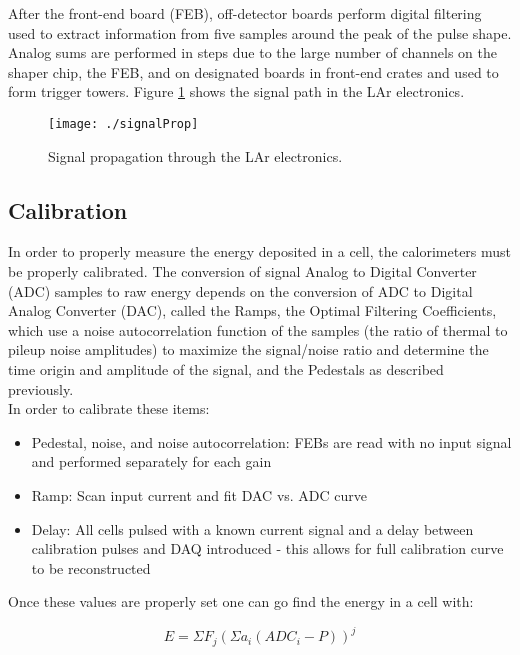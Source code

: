 After the front-end board (FEB), off-detector boards perform digital filtering used to extract information from five samples around the peak of the pulse shape.  Analog sums are performed in steps due to the large number of channels on the shaper chip, the FEB, and on designated boards in front-end crates and used to form trigger towers.  Figure \ref{fig:sigProp} shows the signal path in the LAr electronics.  \\

\begin{figure}[h!]
  \centering
	\texttt{[image: ./signalProp]}
\caption{\label{fig:sigProp}{ Signal propagation through the LAr electronics\cite{larPerf}. }} %
\end{figure}

\subsection{Calibration}

In order to properly measure the energy deposited in a cell, the calorimeters must be properly calibrated.  The conversion of signal Analog to Digital Converter (ADC) samples to raw energy depends on the conversion of ADC to Digital Analog Converter (DAC), called the Ramps, the Optimal Filtering Coefficients, which use a noise autocorrelation function of the samples (the ratio of thermal to pileup noise amplitudes) to maximize the signal/noise ratio and determine the time origin and amplitude of the signal, and the Pedestals as described previously. \\


In order to calibrate these items:
\begin{itemize}
	\item Pedestal, noise, and noise autocorrelation: FEBs are read with no input signal and performed separately for each gain
	\item Ramp: Scan input current and fit DAC vs. ADC curve
	\item Delay: All cells pulsed with a known current signal and a delay between calibration pulses and DAQ introduced - this allows for full calibration curve to be reconstructed
\end{itemize}

Once these values are properly set one can go find the energy in a cell with:

\begin{equation}
	E=\Sigma F_{j} (\Sigma a_{i}(ADC_{i} - P))^{j}
\end{equation}

